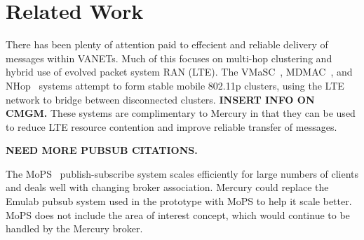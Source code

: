 \section{Related Work}

There has been plenty of attention paid to effecient and reliable
delivery of messages within VANETs.  Much of this focuses on multi-hop
clustering and hybrid use of evolved packet system RAN (LTE).  The
VMaSC~\cite{ucar2016multihop}, MDMAC~\cite{wolny2008modified}, and
NHop~\cite{zhang2011novel} systems attempt to form stable mobile 802.11p
clusters, using the LTE network to bridge between disconnected
clusters. {\bf INSERT INFO ON CMGM.}  These systems are complimentary
to Mercury in that they can be used to reduce LTE resource contention
and improve reliable transfer of messages.

{\bf NEED MORE PUBSUB CITATIONS.}

The MoPS~\cite{nasim2014mobile} publish-subscribe system scales
efficiently for large numbers of clients and deals well with changing
broker association.  Mercury could replace the Emulab pubsub system
used in the prototype with MoPS to help it scale better. MoPS does not
include the area of interest concept, which would continue to be
handled by the Mercury broker.
